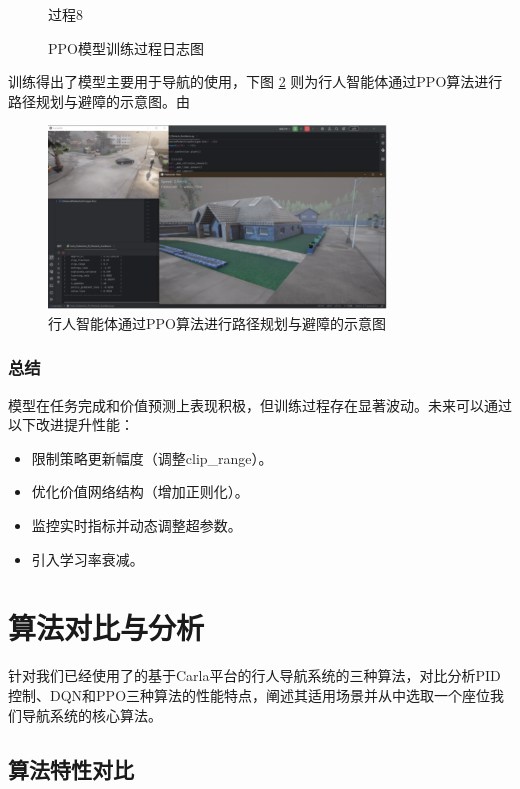 \begin{figure}[H]
\begin{minipage}{0.24\textwidth}
        \caption{过程8}
    \end{minipage}
    \caption{PPO模型训练过程日志图}
    \label{fig:training}
\end{figure}

训练得出了模型主要用于导航的使用，下图 \ref{fig:path_planning} 则为行人智能体通过PPO算法进行路径规划与避障的示意图。由

\begin{figure}[H]
    \centering
    \includegraphics[width=0.8\textwidth]{images/path_planning.pdf}
    \caption{行人智能体通过PPO算法进行路径规划与避障的示意图}
    \label{fig:path_planning}
\end{figure}

\subsubsection{总结}
模型在任务完成和价值预测上表现积极，但训练过程存在显著波动。未来可以通过以下改进提升性能：
\begin{itemize}
    \item 限制策略更新幅度（调整clip\_range）。
    \item 优化价值网络结构（增加正则化）。
    \item 监控实时指标并动态调整超参数。
    \item 引入学习率衰减。
\end{itemize}

\section{算法对比与分析}

针对我们已经使用了的基于Carla平台的行人导航系统的三种算法，对比分析PID控制、DQN和PPO三种算法的性能特点，阐述其适用场景并从中选取一个座位我们导航系统的核心算法。

\subsection{算法特性对比}

